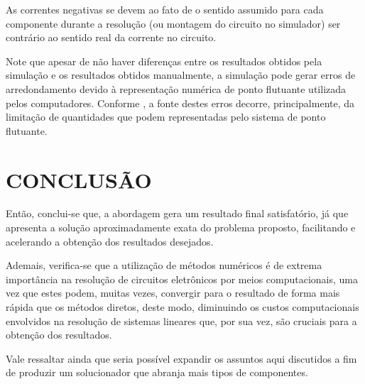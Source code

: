 \documentclass[twocolumn, 10pt,a4paper]{extarticle}
\begin{document}
As correntes negativas se devem ao fato de o sentido assumido para cada componente durante a resolução (ou montagem do circuito no simulador) ser contrário ao sentido real da corrente no circuito.

Note que apesar de não haver diferenças entre os resultados obtidos pela simulação e os resultados obtidos manualmente, a simulação pode gerar erros de arredondamento devido à representação numérica de ponto flutuante utilizada pelos computadores. Conforme \cite{chapra}, a fonte destes erros decorre, principalmente, da limitação de quantidades que podem representadas pelo sistema de ponto flutuante.
\section{CONCLUSÃO}

Então, conclui-se que, a abordagem gera um resultado final satisfatório, já que apresenta a solução aproximadamente exata do problema proposto, facilitando e acelerando a obtenção dos resultados desejados. 

Ademais, verifica-se que a utilização de métodos numéricos é de extrema importância na resolução de circuitos eletrônicos por meios computacionais, uma vez que estes podem, muitas vezes, convergir  para o resultado de forma mais rápida que os métodos diretos, deste modo, diminuindo os custos computacionais envolvidos na resolução de sistemas lineares que, por sua vez, são cruciais para a obtenção dos resultados.

Vale ressaltar ainda que seria possível expandir os assuntos aqui discutidos a fim de produzir um solucionador que abranja mais tipos de componentes.

\renewcommand{\refname}{REFERÊNCIAS}

\end{document}
